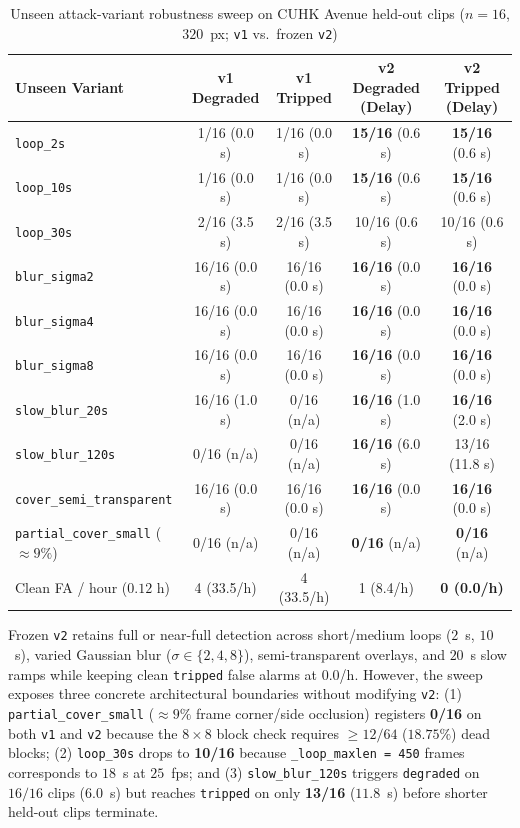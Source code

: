 \begin{table}[!ht]
  \centering
  \caption{Unseen attack-variant robustness sweep on CUHK Avenue held-out clips ($n = 16$, $320$~px; \texttt{v1} vs.\ frozen \texttt{v2})}
  \label{tab:robustness}
  \begin{tabular}{@{}lcccc@{}}
    \toprule
    \textbf{Unseen Variant} & \textbf{v1 Degraded} & \textbf{v1 Tripped} & \textbf{v2 Degraded (Delay)} & \textbf{v2 Tripped (Delay)} \\
    \midrule
    \texttt{loop\_2s} & 1/16 (0.0 s) & 1/16 (0.0 s) & \textbf{15/16} (0.6 s) & \textbf{15/16} (0.6 s) \\
    \texttt{loop\_10s} & 1/16 (0.0 s) & 1/16 (0.0 s) & \textbf{15/16} (0.6 s) & \textbf{15/16} (0.6 s) \\
    \texttt{loop\_30s} & 2/16 (3.5 s) & 2/16 (3.5 s) & 10/16 (0.6 s) & 10/16 (0.6 s) \\
    \texttt{blur\_sigma2} & 16/16 (0.0 s) & 16/16 (0.0 s) & \textbf{16/16} (0.0 s) & \textbf{16/16} (0.0 s) \\
    \texttt{blur\_sigma4} & 16/16 (0.0 s) & 16/16 (0.0 s) & \textbf{16/16} (0.0 s) & \textbf{16/16} (0.0 s) \\
    \texttt{blur\_sigma8} & 16/16 (0.0 s) & 16/16 (0.0 s) & \textbf{16/16} (0.0 s) & \textbf{16/16} (0.0 s) \\
    \texttt{slow\_blur\_20s} & 16/16 (1.0 s) & 0/16 (n/a) & \textbf{16/16} (1.0 s) & \textbf{16/16} (2.0 s) \\
    \texttt{slow\_blur\_120s} & 0/16 (n/a) & 0/16 (n/a) & \textbf{16/16} (6.0 s) & 13/16 (11.8 s) \\
    \texttt{cover\_semi\_transparent} & 16/16 (0.0 s) & 16/16 (0.0 s) & \textbf{16/16} (0.0 s) & \textbf{16/16} (0.0 s) \\
    \texttt{partial\_cover\_small} ($\approx 9\%$) & 0/16 (n/a) & 0/16 (n/a) & \textbf{0/16} (n/a) & \textbf{0/16} (n/a) \\
    \midrule
    Clean FA / hour ($0.12$ h) & 4 (33.5/h) & 4 (33.5/h) & 1 (8.4/h) & \textbf{0 (0.0/h)} \\
    \bottomrule
  \end{tabular}
\end{table}

Frozen \texttt{v2} retains full or near-full detection across short/medium loops ($2$~s, $10$~s), varied Gaussian blur ($\sigma \in \{2,4,8\}$), semi-transparent overlays, and $20$~s slow ramps while keeping clean \texttt{tripped} false alarms at $0.0$/h. However, the sweep exposes three concrete architectural boundaries without modifying \texttt{v2}: (1) \texttt{partial\_cover\_small} ($\approx 9\%$ frame corner/side occlusion) registers \textbf{0/16} on both \texttt{v1} and \texttt{v2} because the $8 \times 8$ block check requires $\ge 12/64$ ($18.75\%$) dead blocks; (2) \texttt{loop\_30s} drops to \textbf{10/16} because \texttt{\_loop\_maxlen = 450} frames corresponds to $18$~s at $25$~fps; and (3) \texttt{slow\_blur\_120s} triggers \texttt{degraded} on $16/16$ clips ($6.0$~s) but reaches \texttt{tripped} on only \textbf{13/16} ($11.8$~s) before shorter held-out clips terminate.

